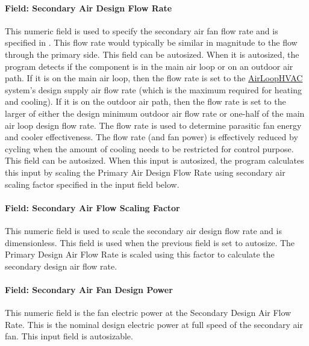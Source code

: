 \paragraph{Field: Secondary Air Design Flow Rate}\label{field-secondary-air-design-flow-rate}

This numeric field is used to specify the secondary air fan flow rate and is specified in \si{\volumeFlowRate}. This flow rate would typically be similar in magnitude to the flow through the primary side. This field can be autosized. When it is autosized, the program detects if the component is in the main air loop or on an outdoor air path. If it is on the main air loop, then the flow rate is set to the \hyperref[airloophvac]{AirLoopHVAC} system's design supply air flow rate (which is the maximum required for heating and cooling). If it is on the outdoor air path, then the flow rate is set to the larger of either the design minimum outdoor air flow rate or one-half of the main air loop design flow rate. The flow rate is used to determine parasitic fan energy and cooler effectiveness. The flow rate (and fan power) is effectively reduced by cycling when the amount of cooling needs to be restricted for control purpose. This field can be autosized. When this input is autosized, the program calculates this input by scaling the Primary Air Design Flow Rate using secondary air scaling factor specified in the input field below.

\paragraph{Field: Secondary Air Flow Scaling Factor}\label{field-secondary-air-flow-scaling-factor}

This numeric field is used to scale the secondary air design flow rate and is dimensionless. This field is used when the previous field is set to autosize. The Primary Design Air Flow Rate is scaled using this factor to calculate the secondary design air flow rate.

\paragraph{Field: Secondary Air Fan Design Power}\label{field-secondary-air-fan-design-power}

This numeric field is the fan electric power at the Secondary Design Air Flow Rate. This is the nominal design electric power at full speed of the secondary air fan. This input field is autosizable.

